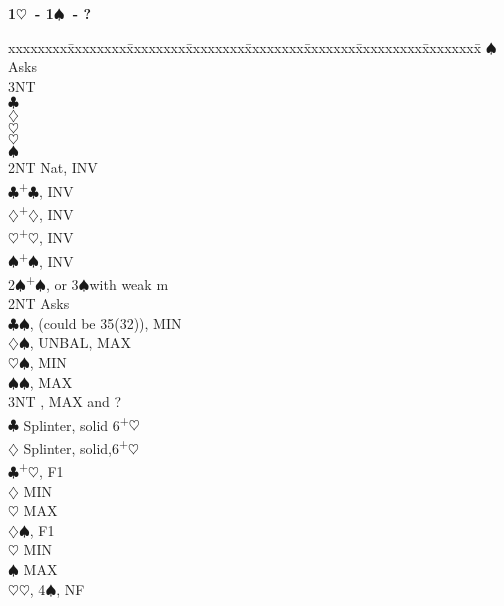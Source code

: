 \documentclass[10pt]{article}
\renewcommand{\c}{$\clubsuit$}
\renewcommand{\d}{$\diamondsuit$}
\newcommand{\h}{$\heartsuit$}
\newcommand{\s}{$\spadesuit$}
\newcommand{\p}{\textsuperscript{+}}
\newenvironment{bidtable}[1][]
{\textbf{#1}
  \begin{adjustwidth}{1em}{}
    \addvspace{2pt}
    \begin{tabbing}
      xxxxxxxx\=xxxxxxxx\=xxxxxxxx\=xxxxxxxx\=xxxxxxxx\=xxxxxxx\=xxxxxxxxx\=xxxxxxxx\=\kill}
{\end{tabbing}\end{adjustwidth}\bigskip}%
\begin{document}
\begin{bidtable}[1\h\ - 1\s\ - ?]
    \>      \>     \s \> Asks                   \\
    \>      \>     \>     \> 3NT \>                    \\
    \>      \>     \>     \c \>                    \\
    \>      \>     \>     \d \>                    \\
    \>      \>     \>     \h \>                    \\
    \>      \>     \>     \h \>                    \\
    \>      \s {}                          \\
    \> 2NT  \> Nat, INV                             \\
    \c  {}\p\c, INV                           \\
    \d  {}\p\d, INV                           \\
    \h  {}\p\h, INV                           \\
    \s  {}\p\s, INV                           \\
2\s {}\p\s, or 3\s with weak m                    \\
    \> 2NT  \> Asks                                 \\
    \>      \c {}\s, (could be 35(32)), MIN   \\
    \>      \d {}\s, UNBAL, MAX               \\
    \>      \h {}\s, MIN                      \\
    \>      \s {}\s, MAX                      \\
    \>      \> 3NT , MAX and ?               \\
    \>      \c \> Splinter, solid 6\p\h         \\
    \>      \d \> Splinter, solid,6\p\h         \\
    \c  {}\p\h, F1                            \\
    \>      \d \> MIN                           \\
    \>      \h \> MAX                           \\
    \d  {}\s, F1                              \\
    \>      \h \> MIN                           \\
    \>      \s \> MAX                           \\
    \h  {}\h, 4\s, NF                         \\

\end{bidtable}
\end{document}
